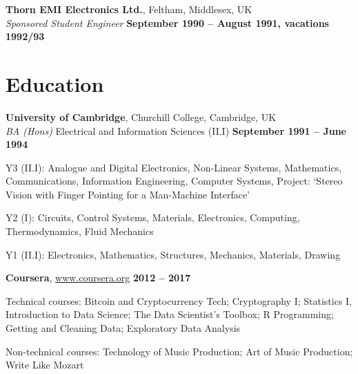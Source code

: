 \documentclass[line]{resume}
\begin{document}
\begin{resume}
    \textbf{Thorn EMI Electronics Ltd.}, Feltham, Middlesex, UK \vspace{2mm}\\\vspace{1mm}%
    \textsl{Sponsored Student Engineer} \hfill \textbf{September 1990 -- August 1991, vacations 1992/93}\vspace{-3mm}\\\vspace{-1mm}%
    \vspace{-1.5mm}


    \section{\mysidestyle Education}

    \textbf{University of Cambridge}, Churchill College, Cambridge, UK \vspace{2mm}\\\vspace{1mm}%
    \textsl{BA (Hons)} Electrical and Information Sciences (II.I)\hfill \textbf{ September 1991 -- June 1994}\vspace{-3mm}\\\vspace{-1mm}%
    \begin{list2}
        \item Y3 (II.I): Analogue and Digital Electronics, Non-Linear Systems,
            Mathematics, Communications, Information Engineering, Computer Systems, Project: `Stereo Vision with Finger
            Pointing for a Man-Machine Interface'
        \item Y2 (I): Circuits, Control Systems, Materials, Electronics, Computing, Thermodynamics, Fluid Mechanics
        \item Y1 (II.I): Electronics, Mathematics, Structures, Mechanics, Materials,  Drawing
    \end{list2}\vspace{-1.5mm}

    \textbf{Coursera}, \url{www.coursera.org}\hfill \textbf{ 2012 -- 2017}\vspace{-3mm}\\\vspace{-1mm}%
    \begin{list2}
        \item Technical courses: Bitcoin and Cryptocurrency Tech; Cryptography I; Statistics I, Introduction to Data
              Science; The Data Scientist's Toolbox; R Programming; Getting and Cleaning Data; Exploratory Data Analysis
        \item Non-technical courses: Technology of Music Production; Art of Music Production; Write Like Mozart
    \end{list2}\vspace{-1.5mm}


\end{resume}
\end{document}
